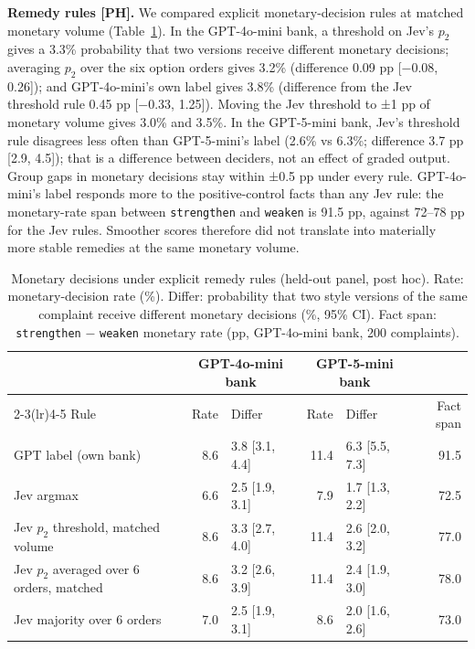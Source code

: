 \textbf{Remedy rules [PH].} We compared explicit monetary-decision rules at matched monetary volume (Table~\ref{tab:rules}). In the GPT-4o-mini bank, a threshold on Jev's $p_2$ gives a 3.3\% probability that two versions receive different monetary decisions; averaging $p_2$ over the six option orders gives 3.2\% (difference 0.09 pp [−0.08, 0.26]); and GPT-4o-mini's own label gives 3.8\% (difference from the Jev threshold rule 0.45 pp [−0.33, 1.25]). Moving the Jev threshold to ±1 pp of monetary volume gives 3.0\% and 3.5\%. In the GPT-5-mini bank, Jev's threshold rule disagrees less often than GPT-5-mini's label (2.6\% vs 6.3\%; difference 3.7 pp [2.9, 4.5]); that is a difference between deciders, not an effect of graded output. Group gaps in monetary decisions stay within ±0.5 pp under every rule. GPT-4o-mini's label responds more to the positive-control facts than any Jev rule: the monetary-rate span between \texttt{strengthen} and \texttt{weaken} is 91.5 pp, against 72--78 pp for the Jev rules. Smoother scores therefore did not translate into materially more stable remedies at the same monetary volume.

\begin{table}[!htbp]
\caption{Monetary decisions under explicit remedy rules (held-out panel, post hoc). Rate: monetary-decision rate (\%). Differ: probability that two style versions of the same complaint receive different monetary decisions (\%, 95\% CI). Fact span: \texttt{strengthen} $-$ \texttt{weaken} monetary rate (pp, GPT-4o-mini bank, 200 complaints).}
\label{tab:rules}
\small
\begin{tabular}{@{}lrlrlr@{}}\toprule
 & \multicolumn{2}{c}{GPT-4o-mini bank} & \multicolumn{2}{c}{GPT-5-mini bank} & \\
\cmidrule(lr){2-3}\cmidrule(lr){4-5}
Rule & Rate & Differ & Rate & Differ & Fact span \\
\midrule
GPT label (own bank) & 8.6 & 3.8 [3.1, 4.4] & 11.4 & 6.3 [5.5, 7.3] & 91.5 \\
Jev argmax & 6.6 & 2.5 [1.9, 3.1] & 7.9 & 1.7 [1.3, 2.2] & 72.5 \\
Jev $p_2$ threshold, matched volume & 8.6 & 3.3 [2.7, 4.0] & 11.4 & 2.6 [2.0, 3.2] & 77.0 \\
Jev $p_2$ averaged over 6 orders, matched & 8.6 & 3.2 [2.6, 3.9] & 11.4 & 2.4 [1.9, 3.0] & 78.0 \\
Jev majority over 6 orders & 7.0 & 2.5 [1.9, 3.1] & 8.6 & 2.0 [1.6, 2.6] & 73.0 \\
\bottomrule
\end{tabular}
\end{table}

